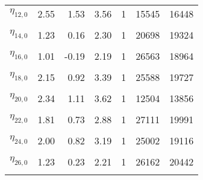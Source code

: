 \begin{longtable}[t]{lrrrrrr}
$\eta_{12,  0}$ & 2.55 & 1.53 & 3.56 & 1 & 15545 & 16448\\
\cellcolor{gray!6}{$\eta_{13,  0}$} & \cellcolor{gray!6}{2.21} & \cellcolor{gray!6}{1.29} & \cellcolor{gray!6}{3.13} & \cellcolor{gray!6}{1} & \cellcolor{gray!6}{27142} & \cellcolor{gray!6}{19730}\\
$\eta_{14,  0}$ & 1.23 & 0.16 & 2.30 & 1 & 20698 & 19324\\
\cellcolor{gray!6}{$\eta_{15,  0}$} & \cellcolor{gray!6}{1.11} & \cellcolor{gray!6}{0.21} & \cellcolor{gray!6}{2.02} & \cellcolor{gray!6}{1} & \cellcolor{gray!6}{27804} & \cellcolor{gray!6}{20001}\\
$\eta_{16,  0}$ & 1.01 & -0.19 & 2.19 & 1 & 26563 & 18964\\
\cellcolor{gray!6}{$\eta_{17,  0}$} & \cellcolor{gray!6}{1.62} & \cellcolor{gray!6}{0.76} & \cellcolor{gray!6}{2.48} & \cellcolor{gray!6}{1} & \cellcolor{gray!6}{29577} & \cellcolor{gray!6}{20050}\\
$\eta_{18,  0}$ & 2.15 & 0.92 & 3.39 & 1 & 25588 & 19727\\
\cellcolor{gray!6}{$\eta_{19,  0}$} & \cellcolor{gray!6}{1.53} & \cellcolor{gray!6}{0.78} & \cellcolor{gray!6}{2.28} & \cellcolor{gray!6}{1} & \cellcolor{gray!6}{23475} & \cellcolor{gray!6}{19586}\\
$\eta_{20,  0}$ & 2.34 & 1.11 & 3.62 & 1 & 12504 & 13856\\
\cellcolor{gray!6}{$\eta_{21,  0}$} & \cellcolor{gray!6}{3.13} & \cellcolor{gray!6}{2.27} & \cellcolor{gray!6}{3.99} & \cellcolor{gray!6}{1} & \cellcolor{gray!6}{24809} & \cellcolor{gray!6}{19186}\\
$\eta_{22,  0}$ & 1.81 & 0.73 & 2.88 & 1 & 27111 & 19991\\
\cellcolor{gray!6}{$\eta_{23,  0}$} & \cellcolor{gray!6}{2.22} & \cellcolor{gray!6}{0.92} & \cellcolor{gray!6}{3.53} & \cellcolor{gray!6}{1} & \cellcolor{gray!6}{22125} & \cellcolor{gray!6}{19863}\\
$\eta_{24,  0}$ & 2.00 & 0.82 & 3.19 & 1 & 25002 & 19116\\
\cellcolor{gray!6}{$\eta_{25,  0}$} & \cellcolor{gray!6}{2.97} & \cellcolor{gray!6}{1.93} & \cellcolor{gray!6}{4.00} & \cellcolor{gray!6}{1} & \cellcolor{gray!6}{17267} & \cellcolor{gray!6}{18883}\\
$\eta_{26,  0}$ & 1.23 & 0.23 & 2.21 & 1 & 26162 & 20442\\
\cellcolor{gray!6}{$\eta_{27,  0}$} & \cellcolor{gray!6}{1.40} & \cellcolor{gray!6}{0.55} & \cellcolor{gray!6}{2.25} & \cellcolor{gray!6}{1} & \cellcolor{gray!6}{29489} & \cellcolor{gray!6}{19512}\\

\end{longtable}
